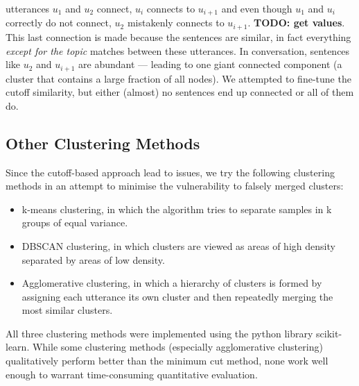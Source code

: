         \Glspl{utterance} $u_1$ and $u_2$ connect, $u_{i}$ connects to $u_{i+1}$ and even though $u_1$ and $u_{i}$ correctly do not connect, $u_2$ mistakenly connects to $u_{i+1}$. \color{red} \textbf{TODO: get values}. \color{black} This last connection is made because the sentences are similar, in fact everything \textit{except for the topic} matches between these \glspl{utterance}. In conversation, sentences like $u_2$ and $u_{i+1}$ are abundant --- leading to one giant connected component (a cluster that contains a large fraction of all nodes). We attempted to fine-tune the cutoff similarity, but either (almost) no sentences end up connected or all of them do.


    \subsection{Other Clustering Methods}
        Since the cutoff-based approach lead to issues, we try the following clustering methods in an attempt to minimise the vulnerability to falsely merged clusters:
        \begin{itemize}
            \item k-means clustering, in which the algorithm tries to separate samples in k groups of equal variance.
            \item DBSCAN clustering, in which clusters are viewed as areas of high density separated by areas of low density.
            \item Agglomerative clustering, in which a hierarchy of clusters is formed by assigning each \gls{utterance} its own cluster and then repeatedly merging the most similar clusters.
        \end{itemize}
        All three clustering methods were implemented using the python library scikit-learn\cite{scikit-learn}. While some clustering methods (especially agglomerative clustering) qualitatively perform better than the minimum cut method, none work well enough to warrant time-consuming quantitative evaluation.


